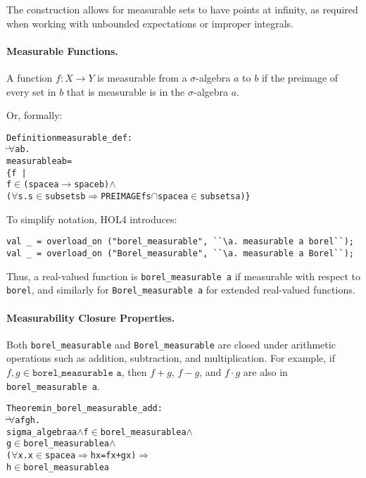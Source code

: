 The construction allows for measurable sets to have points at infinity, as required when working with unbounded expectations or improper integrals.

\paragraph{Measurable Functions.}
A function $f : X \to Y$ is measurable from a $\sigma$-algebra $a$ to $b$ if the preimage of every set in $b$ that is measurable is in the $\sigma$-algebra $a$.

Or, formally:

\begin{hol}
  \begin{alltt}
    Definition measurable\_def :
    \(\!\!\!{\turn}\!\!\!\!\) \(\forall\)a b.
    measurable a b =
    \{f \,|\,
    f \(\in\) (space a \(\rightarrow\) space b) \(\land\)
    (\(\forall\)s. s \(\in\) subsets b \(\Rightarrow\) PREIMAGE f s \(\cap\) space a \(\in\) subsets a)\}
  \end{alltt}
\end{hol}

To simplify notation, HOL4 introduces:
\begin{hol}
\begin{verbatim}
val _ = overload_on ("borel_measurable", ``\a. measurable a borel``);
val _ = overload_on ("Borel_measurable", ``\a. measurable a Borel``);
\end{verbatim}
\end{hol}

Thus, a real-valued function is \texttt{borel\_measurable a} if measurable with respect to \texttt{borel}, and similarly for \texttt{Borel\_measurable a} for extended real-valued functions.

\paragraph{Measurability Closure Properties.}
Both \texttt{borel\_measurable} and \texttt{Borel\_measurable} are closed under arithmetic operations such as addition, subtraction, and multiplication. For example, if $ f, g \in \texttt{borel\_measurable a} $, then $ f + g $, $ f - g $, and $ f \cdot g $ are also in \texttt{borel\_measurable a}.

\begin{hol}
\begin{alltt}
Theorem in\_borel\_measurable\_add :
\(\!\!\!{\turn}\!\!\!\!\) \(\forall\)a f g h.
sigma\_algebra a \(\land\) f \(\in\) borel\_measurable a \(\land\)
g \(\in\) borel\_measurable a \(\land\)
(\(\forall\)x. x \(\in\) space a \(\Rightarrow\) h x = f x + g x) \(\Rightarrow\)
h \(\in\) borel\_measurable a
\end{alltt}
\end{hol}

